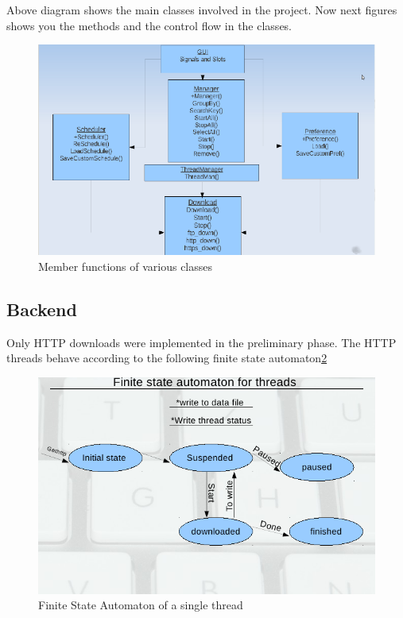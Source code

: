 \documentclass[pdftex,12pt,a4paper,pdfencoding=unicode]{article}
\begin{document}
\begin{onehalfspace}
       Above diagram shows the main classes involved in the project. Now next figures shows you the methods and the control flow in the
       classes.

       \begin{figure}[h!]
         \includegraphics[scale=0.90]{pic/methods.png}
         \caption{Member functions of various classes \label{fig:methods}}
       \end{figure}

       \subsection{Backend}
       Only HTTP downloads were implemented in the preliminary phase. The HTTP threads behave according to the following finite state
       automaton\ref{fig:ts}

       \begin{figure}[h!]
        \includegraphics[scale=0.90]{pic/ts.png}
         \caption{Finite State Automaton of a single thread \label{fig:ts}}
       \end{figure}

       
\end{onehalfspace}
\end{document}
